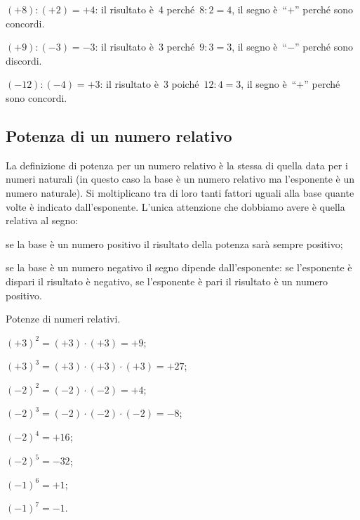 \begin{exrig}
 \begin{esempio}
$(+8):(+2)=+4$: il risultato è~4 perché~$8:2=4$, il segno è~``$+$'' perché sono concordi.
 \end{esempio}

\begin{esempio}
$(+9):(-3)=-3$: il risultato è~3 perché~$9:3=3$, il segno è~``$-$'' perché sono discordi.
 \end{esempio}

\begin{esempio}
$(-12):(-4)=+3$: il risultato è~3 poiché~$12:4=3$, il segno è~``$+$'' perché sono concordi.
 \end{esempio}

\end{exrig}

\ovalbox{\risolvii \ref{ese:2.19}, \ref{ese:2.20}, \ref{ese:2.21}}

\subsection{Potenza di un numero relativo}

La definizione di potenza per un numero relativo è la stessa di quella data per i numeri naturali
(in questo caso la base è un numero relativo ma l'esponente è un numero naturale).
Si moltiplicano tra di loro tanti fattori uguali alla base quante volte è indicato dall'esponente.
L'unica attenzione che dobbiamo avere è quella relativa al segno:
 \begin{itemize*}
 \item se la base è un numero positivo il risultato della potenza sarà sempre positivo;
 \item se la base è un numero negativo il segno dipende dall'esponente: se l'esponente è dispari il
risultato è negativo, se l'esponente è pari il risultato è un numero positivo.
 \end{itemize*}

\begin{exrig}
 \begin{esempio}
 Potenze di numeri relativi.
 \begin{itemize*}
 \item $(+3)^2=(+3)\cdot(+3)=+9$;
 \item $(+3)^3=(+3)\cdot(+3)\cdot(+3)=+27$;
 \item $(-2)^2=(-2)\cdot(-2)=+4$;
 \item $(-2)^3=(-2)\cdot(-2)\cdot(-2)=-8$;
 \item $(-2)^4=+16$;
 \item $(-2)^5=-32$;
 \item $(-1)^6=+1$;
 \item $(-1)^7=-1$.
 \end{itemize*}

 \end{esempio}

\end{exrig}

